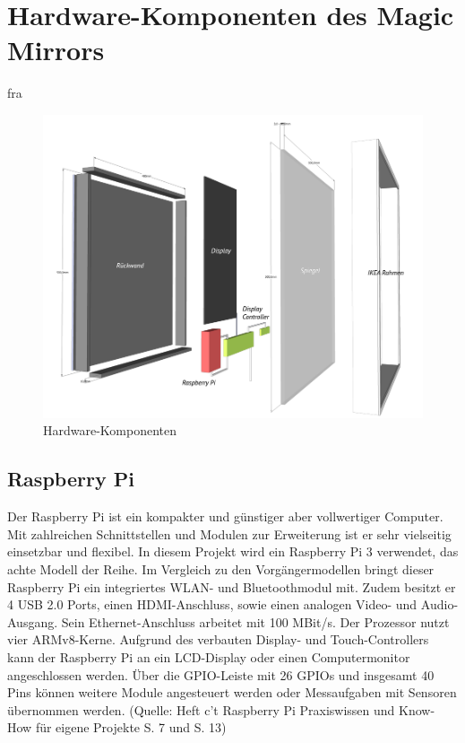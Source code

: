 \documentclass[12pt,a4paper]{report}
\begin{document}
\chapter{Hardware-Komponenten des Magic Mirrors}
fra
\begin{figure}[h]
\hspace{-50pt}
\includegraphics[scale=.5]{Bauteile.png} 
\caption{Hardware-Komponenten}
\end{figure}
\section{Raspberry Pi}
Der Raspberry Pi ist ein kompakter und günstiger aber vollwertiger Computer. Mit zahlreichen Schnittstellen und Modulen zur Erweiterung ist er sehr vielseitig einsetzbar und flexibel. In diesem Projekt wird ein Raspberry Pi 3 verwendet, das achte Modell der Reihe. Im Vergleich zu den Vorgängermodellen bringt dieser Raspberry Pi ein integriertes WLAN- und Bluetoothmodul mit. Zudem besitzt er 4 USB 2.0 Ports, einen HDMI-Anschluss, sowie einen analogen Video- und Audio-Ausgang. Sein Ethernet-Anschluss arbeitet mit 100 MBit/s. Der Prozessor nutzt vier ARMv8-Kerne. Aufgrund des verbauten Display- und Touch-Controllers kann der Raspberry Pi an ein LCD-Display oder einen Computermonitor angeschlossen werden. Über die GPIO-Leiste mit 26 GPIOs und insgesamt 40 Pins können weitere Module angesteuert werden oder Messaufgaben mit Sensoren übernommen werden. (Quelle: Heft c't Raspberry Pi Praxiswissen und Know-How für eigene Projekte S. 7 und S. 13)
\end{document}
